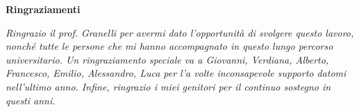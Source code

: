 \thispagestyle{empty}

\begin{center}
  {\bf \Huge Ringraziamenti}
\end{center}

\vspace{4cm}


\emph{
Ringrazio il prof. Granelli per avermi dato l'opportunità di svolgere questo lavoro, nonché tutte le persone che mi hanno accompagnato in questo lungo percorso universitario. Un ringraziamento speciale va a Giovanni, Verdiana, Alberto, Francesco, Emilio, Alessandro, Luca per l'a volte inconsapevole supporto datomi nell'ultimo anno. Infine, ringrazio i miei genitori per il continuo sostegno in questi anni.
}
